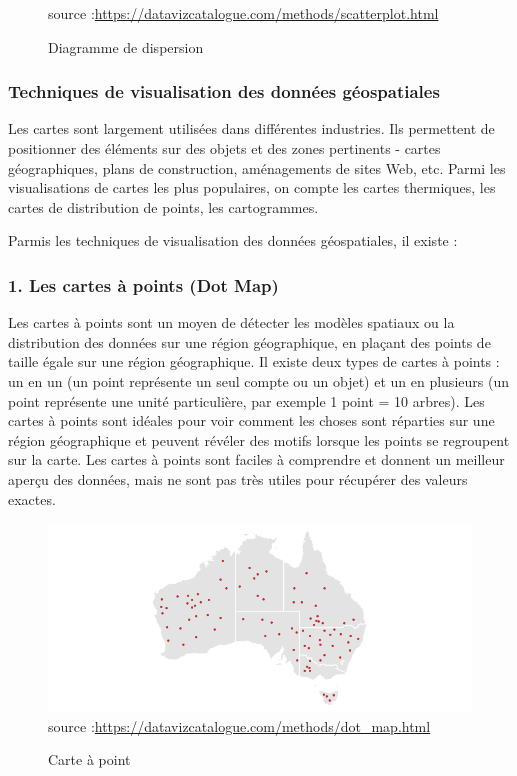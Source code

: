 \documentclass[french, a4paper, 12pt]{report}
\begin{document}
\begin{figure}[!htb]
\begin{minipage}{0.35\linewidth}
    \scriptsize{source :\url{https://datavizcatalogue.com/methods/scatterplot.html}}
    \caption{Diagramme de dispersion}
 \label{fig:1.6}
\end{minipage}
\end{figure}

\subsubsection{Techniques de visualisation des données géospatiales}
Les cartes sont largement utilisées dans différentes industries. Ils permettent de positionner des éléments sur des objets et des zones pertinents - cartes géographiques, plans de construction, aménagements de sites Web, etc. Parmi les visualisations de cartes les plus populaires, on compte les cartes thermiques, les cartes de distribution de points, les cartogrammes.

Parmis les techniques de visualisation des données géospatiales, il existe : 
\subsubsection{1. Les cartes à points (Dot Map)}
Les cartes à points sont un moyen de détecter les modèles spatiaux ou la distribution des données sur une région géographique, en plaçant des points de taille égale sur une région géographique.
Il existe deux types de cartes à points : un en un (un point représente un seul compte ou un objet) et un en plusieurs (un point représente une unité particulière, par exemple 1 point = 10 arbres).
Les cartes à points sont idéales pour voir comment les choses sont réparties sur une région géographique et peuvent révéler des motifs lorsque les points se regroupent sur la carte. Les cartes à points sont faciles à comprendre et donnent un meilleur aperçu des données, mais ne sont pas très utiles pour récupérer des valeurs exactes.
\begin{figure}[!ht]
    \centering
    \includegraphics[height=5cm]{images/dot_map.png}
    \scriptsize{source :\url{https://datavizcatalogue.com/methods/dot_map.html}}
    \caption{Carte à point}
    \label{fig:1.7}
\end{figure}
\end{document}
